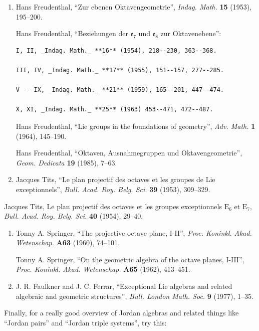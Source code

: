 \documentclass{article}
\begin{document}
\begin{enumerate}
\def\labelenumi{\arabic{enumi})}
\setcounter{enumi}{19}
\item
  Hans Freudenthal, ``Zur ebenen Oktavengeometrie'', \emph{Indag. Math.}
  \textbf{15} (1953), 195--200.

  Hans Freudenthal, ``Beziehungen der \(\mathfrak{e}_7\) und
  \(\mathfrak{e}_8\) zur Oktavenebene'':

\begin{verbatim}
I, II, _Indag. Math._ **16** (1954), 218--230, 363--368.

III, IV, _Indag. Math._ **17** (1955), 151--157, 277--285.

V -- IX, _Indag. Math._ **21** (1959), 165--201, 447--474.

X, XI, _Indag. Math._ **25** (1963) 453--471, 472--487.
\end{verbatim}

  Hans Freudenthal, ``Lie groups in the foundations of geometry'',
  \emph{Adv. Math.} \textbf{1} (1964), 145--190.

  Hans Freudenthal, ``Oktaven, Ausnahmegruppen und Oktavengeometrie'',
  \emph{Geom. Dedicata} \textbf{19} (1985), 7--63.
\item
  Jacques Tits, ``Le plan projectif des octaves et les groupes de Lie
  exceptionnels'', \emph{Bull. Acad. Roy. Belg. Sci.} \textbf{39}
  (1953), 309--329.
\end{enumerate}

Jacques Tits, Le plan projectif des octaves et les groupes exceptionnels
\(\mathrm{E}_6\) et \(\mathrm{E}_7\), \emph{Bull. Acad. Roy. Belg. Sci.}
\textbf{40} (1954), 29--40.

\begin{enumerate}
\def\labelenumi{\arabic{enumi})}
\setcounter{enumi}{21}
\item
  Tonny A. Springer, ``The projective octave plane, I-II'', \emph{Proc.
  Koninkl. Akad. Wetenschap.} \textbf{A63} (1960), 74--101.

  Tonny A. Springer, ``On the geometric algebra of the octave planes,
  I-III'', \emph{Proc. Koninkl. Akad. Wetenschap.} \textbf{A65} (1962),
  413--451.
\item
  J. R. Faulkner and J. C. Ferrar, ``Exceptional Lie algebras and
  related algebraic and geometric structures'', \emph{Bull. London Math.
  Soc.} \textbf{9} (1977), 1--35.
\end{enumerate}

Finally, for a really good overview of Jordan algebras and related
things like ``Jordan pairs'' and ``Jordan triple systems'', try this:
\end{document}
